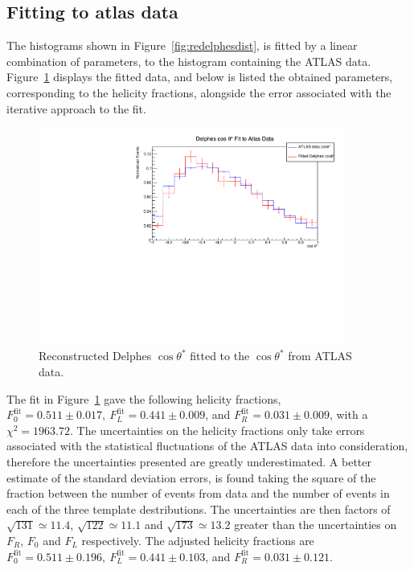 \documentclass[12pt,a4paper]{article}
\numberwithin{equation}{section}
\begin{document}
\subsection{Fitting to atlas data}
The histograms shown in Figure~\ref{fig:redelphesdist}, is fitted by a linear
combination of parameters, to the histogram containing the ATLAS data.
Figure~\ref{fig:delphesfit} displays the fitted data, and below is listed the
obtained parameters, corresponding to the helicity fractions, alongside the
error associated with the iterative approach to the fit.

\begin{figure}[H]
  \centering
  \includegraphics[width=0.9\textwidth]{figures/delphes_fit}
  \caption{\label{fig:delphesfit}Reconstructed Delphes $\cos \theta^{*}$ fitted to
    the $\cos \theta^{*}$ from ATLAS data.}
\end{figure}


The fit in Figure~\ref{fig:delphesfit} gave the following helicity fractions,
$F_0^{\mathrm{fit}} = 0.511 \pm 0.017,\ F_L^{\mathrm{fit}} = 0.441 \pm 0.009$,
and $F_R^{\mathrm{fit}} = 0.031 \pm 0.009$, with a $\chi^2 = 1963.72$. The
uncertainties on the helicity fractions only take errors associated with the
statistical fluctuations of the ATLAS data into consideration, therefore the
uncertainties presented are greatly underestimated. A better estimate of the
standard deviation errors, is found taking the square of the fraction between
the number of events from data and the number of events in each of the three
template destributions. The uncertainties are then factors of
$\sqrt{131} \simeq 11.4$, $\sqrt{122} \simeq 11.1$ and $\sqrt{173} \simeq 13.2$ greater than
the uncertainties on $F_R$, $F_0$ and $F_L$ respectively. The adjusted helicity
fractions are
$F_0^{\mathrm{fit}} = 0.511 \pm 0.196,\ F_L^{\mathrm{fit}} = 0.441 \pm 0.103$,
and $F_R^{\mathrm{fit}} = 0.031 \pm 0.121$.
\end{document}

